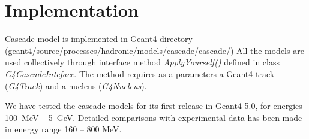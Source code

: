 \section{Implementation}


Cascade model is implemented in {\sc Geant4} directory (geant4/source/processes/hadronic/models/cascade/cascade/)
All the models are used collectively through interface method {\it ApplyYourself()} defined in class {\it G4CascadeInteface}.
The method requires as a parameters a {\sc Geant4} track  ({\it G4Track}) and a nucleus ({\it G4Nucleus}). 

We have tested the cascade models for its first release in {\sc Geant4 5.0}, for energies 100~MeV -- 5~GeV. 
Detailed comparisons with experimental data has been made in energy range 160 -- 800 MeV. 

